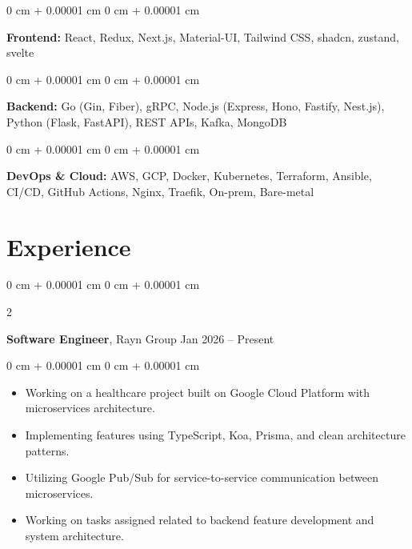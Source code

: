 \documentclass[10pt, letterpaper]{article}
\newenvironment{highlights}{
    \begin{itemize}[
        topsep=0.10 cm,
        parsep=0.10 cm,
        partopsep=0pt,
        itemsep=0pt,
        leftmargin=0 cm + 10pt
    ]
}{
    \end{itemize}
} %
\newenvironment{onecolentry}{
    \begin{adjustwidth}{
        0 cm + 0.00001 cm
    }{
        0 cm + 0.00001 cm
    }
}{
    \end{adjustwidth}
} %
\newenvironment{twocolentry}[2][]{
    \onecolentry
    \def\secondColumn{#2}
    \setcolumnwidth{\fill, 4.5 cm}
    \begin{paracol}{2}
}{
    \switchcolumn \raggedleft \secondColumn
    \end{paracol}
    \endonecolentry
} %
\begin{document}
    \begin{onecolentry}
        \textbf{Frontend:} React, Redux, Next.js, Material-UI, Tailwind CSS, shadcn, zustand, svelte
    \end{onecolentry}

    \vspace{0.2 cm}

    \begin{onecolentry}
        \textbf{Backend:} Go (Gin, Fiber), gRPC, Node.js (Express, Hono, Fastify, Nest.js), Python (Flask, FastAPI), REST APIs, Kafka, MongoDB
    \end{onecolentry}

    \vspace{0.2 cm}

    \begin{onecolentry}
        \textbf{DevOps \& Cloud:} AWS, GCP, Docker, Kubernetes, Terraform, Ansible, CI/CD, GitHub Actions, Nginx, Traefik, On-prem, Bare-metal
    \end{onecolentry}

    \section{Experience}

    \begin{twocolentry}{
        Jan 2026 – Present
    }
        \textbf{Software Engineer}, Rayn Group\end{twocolentry}

    \vspace{0.10 cm}
    \begin{onecolentry}
        \begin{highlights}
            \item Working on a healthcare project built on Google Cloud Platform with microservices architecture.
            \item Implementing features using TypeScript, Koa, Prisma, and clean architecture patterns.
            \item Utilizing Google Pub/Sub for service-to-service communication between microservices.
            \item Working on tasks assigned related to backend feature development and system architecture.
        \end{highlights}
    \end{onecolentry}

    \vspace{0.2 cm}
\end{document}

